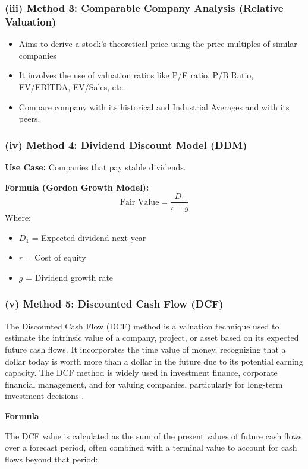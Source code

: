 \documentclass[12pt]{article}
\begin{document}
\subsubsection*{(iii) Method 3: Comparable Company Analysis (Relative Valuation)}
\begin{itemize}
    \item Aims to derive a stock's theoretical price using the price multiples of similar companies
    \item It involves the use of valuation ratios like P/E ratio, P/B Ratio, EV/EBITDA, EV/Sales, etc.
    \item Compare company with its historical and Industrial Averages and with its peers.
\end{itemize}

\subsubsection*{(iv) Method 4: Dividend Discount Model (DDM)}
\textbf{Use Case:} Companies that pay stable dividends.

\textbf{Formula (Gordon Growth Model):}
\[
\text{Fair Value} = \frac{D_1}{r - g}
\]
Where:
\begin{itemize}
    \item \( D_1 \) = Expected dividend next year
    \item \( r \) = Cost of equity
    \item \( g \) = Dividend growth rate
\end{itemize}

\subsubsection*{(v) Method 5: Discounted Cash Flow (DCF)}

The Discounted Cash Flow (DCF) method is a valuation technique used to estimate the intrinsic value of a company, project, or asset based on its expected future cash flows. It incorporates the time value of money, recognizing that a dollar today is worth more than a dollar in the future due to its potential earning capacity. The DCF method is widely used in investment finance, corporate financial management, and for valuing companies, particularly for long-term investment decisions \cite{InvestopediaDCF}.

\textbf{Formula}

The DCF value is calculated as the sum of the present values of future cash flows over a forecast period, often combined with a terminal value to account for cash flows beyond that period:
\end{document}
